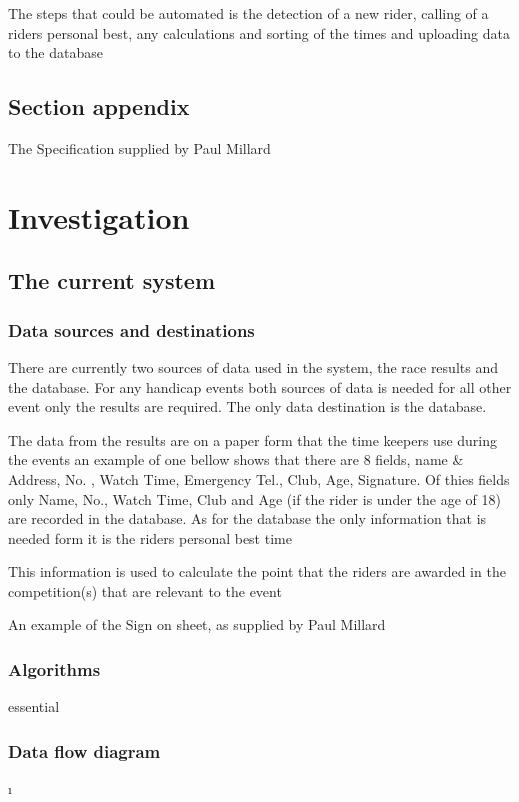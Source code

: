 The steps that could be automated is the detection of a new rider, calling of a riders personal best, any calculations and sorting of the times and uploading data to the database
\subsection{Section appendix}

The Specification supplied by Paul Millard

\section{Investigation}

\subsection{The current system}

\subsubsection{Data sources and destinations}
There are currently two sources of data used in the system, the race results and the database. For any handicap events both sources of data is needed for all other event only the results are required. The only data destination is the database.

The data from the results are on a paper form that the time keepers use during the events an example of one bellow shows that there are 8 fields, name & Address, No. , Watch Time, Emergency Tel., Club, Age, Signature. Of thies fields only Name, No., Watch Time, Club and Age (if the rider is under the age of 18) are recorded in the database. As for the database the only information that is needed form it is the riders personal best time

This information is used to calculate the point that the riders are awarded in the competition(s) that are relevant to the event

An example of the Sign on sheet, as supplied by Paul Millard


\subsubsection{Algorithms}
essential
\subsubsection{Data flow diagram}\i


